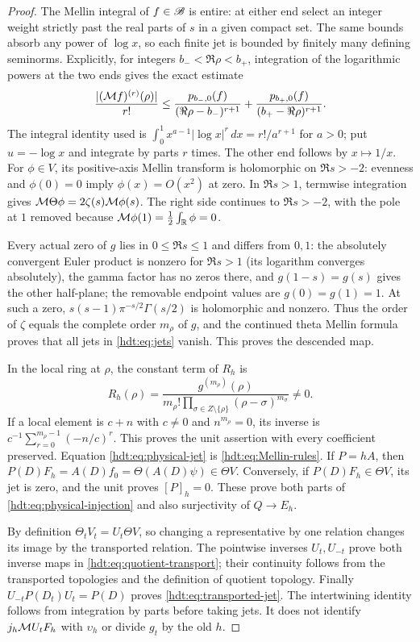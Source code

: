\begin{proof}
The Mellin integral of $f\in\mathscr B$ is entire: at either end select
an integer weight strictly past the real parts of $s$ in a given
compact set. The same bounds absorb any power of $\log x$, so
each finite jet is bounded by finitely many defining seminorms.
Explicitly, for integers $b_-<\Re\rho<b_+$, integration of the
logarithmic powers at the two ends gives the exact estimate
\[
\frac{|(\mathcal M f)^{(r)}(\rho)|}{r!}
\leq\frac{p_{b_-,0}(f)}{(\Re\rho-b_-)^{r+1}}
+\frac{p_{b_+,0}(f)}{(b_+-\Re\rho)^{r+1}}.
\]
The integral identity used is
$\int_0^1x^{a-1}|\log x|^r\,dx=r!/a^{r+1}$ for $a>0$;
put $u=-\log x$ and integrate by parts $r$ times. The other
end follows by $x\mapsto1/x$.
For $\phi\in V$, its positive-axis Mellin transform is holomorphic
on $\Re s>-2$: evenness and $\phi(0)=0$ imply $\phi(x)=O(x^2)$
at zero. In $\Re s>1$, termwise integration gives
$\mathcal M\Theta\phi=2\zeta(s)\mathcal M\phi(s)$.
The right side continues to $\Re s>-2$, with the pole at $1$
removed because $\mathcal M\phi(1)=\tfrac12\int_\mathbb R\phi=0$.

Every actual zero of $g$ lies in $0\leq\Re s\leq1$ and differs
from $0,1$: the absolutely convergent Euler product is nonzero for
$\Re s>1$ (its logarithm converges absolutely), the gamma factor
has no zeros there, and $g(1-s)=g(s)$ gives the other half-plane;
the removable endpoint values are $g(0)=g(1)=1$.
At such a zero, $s(s-1)\pi^{-s/2}\Gamma(s/2)$ is holomorphic
and nonzero. Thus the order of $\zeta$ equals the complete order
$m_\rho$ of $g$, and the continued theta Mellin formula proves
that all jets in \eqref{hdt:eq:jets} vanish. This proves the descended map.

In the local ring at $\rho$, the constant term of $R_h$ is
\[
R_h(\rho)=\frac{g^{(m_\rho)}(\rho)}
{m_\rho!\prod_{\sigma\in Z\setminus\{\rho\}}
(\rho-\sigma)^{m_\sigma}}\ne0.
\]
If a local element is $c+n$ with $c\ne0$ and $n^{m_\rho}=0$,
its inverse is $c^{-1}\sum_{r=0}^{m_\rho-1}(-n/c)^r$.
This proves the unit assertion with every coefficient preserved.
Equation \eqref{hdt:eq:physical-jet} is \eqref{hdt:eq:Mellin-rules}.
If $P=hA$, then $P(D)F_h=A(D)f_0=\Theta(A(D)\psi)\in\Theta V$.
Conversely, if $P(D)F_h\in\Theta V$, its jet is zero, and the
unit proves $[P]_h=0$. These prove both parts of
\eqref{hdt:eq:physical-injection} and also surjectivity of $Q\to E_h$.

By definition $\Theta_tV_t=U_t\Theta V$, so changing a representative
by one relation changes its image by the transported relation.
The pointwise inverses $U_t,U_{-t}$ prove both inverse maps in
\eqref{hdt:eq:quotient-transport}; their continuity follows from the
transported topologies and the definition of quotient topology.
Finally $U_{-t}P(D_t)U_t=P(D)$ proves
\eqref{hdt:eq:transported-jet}. The intertwining identity follows from
integration by parts before taking jets. It does not identify
$j_h\mathcal M U_tF_h$ with $\upsilon_h$ or divide $g_t$ by the old $h$.
\end{proof}

